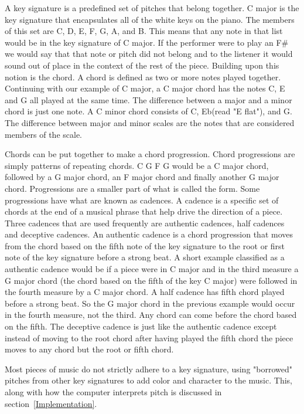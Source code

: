 \documentclass[12pt]{ucthesis}
\begin{document}
A key signature is a predefined set of pitches that belong together. C major is the key signature that encapsulates all of the white keys on the piano. The members of this set are C, D, E, F, G, A, and B. This means that any note in that list would be in the key signature of C major. If the performer were to play an F\# we would say that that note or pitch did not belong and to the listener it would sound out of place in the context of the rest of the piece. Building upon this notion is the chord. A chord is defined as two or more notes played together. Continuing with our example of C major, a C major chord has the notes C, E and G all played at the same time. The difference between a major and a minor chord is just one note. A C minor chord consists of C, Eb(read "E flat"), and G. The difference between major and minor scales are the notes that are considered members of the scale.

Chords can be put together to make a chord progression. Chord progressions are simply patterns of repeating chords. C G F G would be a C major chord, followed by a G major chord, an F major chord and finally another G major chord. Progressions are a smaller part of what is called the form. Some progressions have what are known as cadences. A cadence is a specific set of chords at the end of a musical phrase that help drive the direction of a piece. Three cadences that are used frequently are authentic cadences, half cadences and deceptive cadences. An authentic cadence is a chord progression that moves from the chord based on the fifth note of the key signature to the root or first note of the key signature before a strong beat. A short example classified as a authentic cadence would be if a piece were in C major and in the third measure a G major chord (the chord based on the fifth of the key C major) were followed in the fourth measure by a C major chord. A half cadence has fifth chord played before a strong beat. So the G major chord in the previous example would occur in the fourth measure, not the third. Any chord can come before the chord based on the fifth. The deceptive cadence is just like the authentic cadence except instead of moving to the root chord after having played the fifth chord the piece moves to any chord but the root or fifth chord. 

Most pieces of music do not strictly adhere to a key signature, using "borrowed" pitches from other key signatures to add color and character to the music. This, along with how the computer interprets pitch is discussed in section~\ref{Implementation}.
\end{document}
